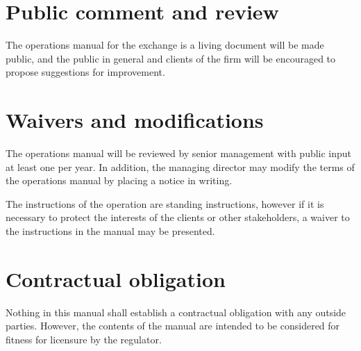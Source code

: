 \section{Public comment and review}
The operations manual for the exchange is a living document will be
made public, and the public in general and clients of the firm will be
encouraged to propose suggestions for improvement.

\section{Waivers and modifications}
The operations manual will be reviewed by senior management with
public input at least one per year.  In addition, the managing
director may modify the terms of the operations manual by placing a
notice in writing.

The instructions of the operation are standing instructions, however
if it is necessary to protect the interests of the
clients or other stakeholders, a waiver to the instructions in the
manual may be presented.

\section{Contractual obligation}
Nothing in this manual shall establish a contractual obligation with
any outside parties.  However, the contents of the manual are intended
to be considered for fitness for licensure by the regulator.

